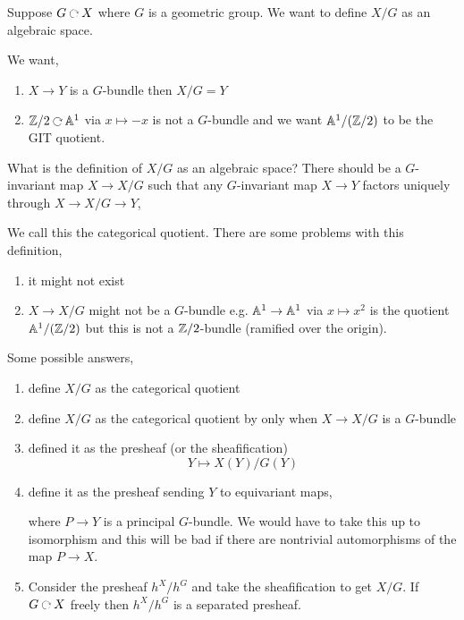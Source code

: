 \documentclass[12pt]{article}
\begin{document}
Suppose $G \acts X$ where $G$ is a geometric group. We want to define $X / G$ as an algebraic space. 

\begin{example}
We want,
\begin{enumerate}
\item $X \to Y$ is a $G$-bundle then $X/G = Y$
\item $\Z / 2 \acts \A^1$ via $x \mapsto -x$ is not a $G$-bundle and we want $\mathbb{A}^1 / (\mathbb{Z} / 2)$ to be the GIT quotient. 
\end{enumerate}
\end{example}
\noindent
What is the definition of $X/G$ as an algebraic space? There should be a $G$-invariant map $X \to X/G$ such that any $G$-invariant map $X \to Y$ factors uniquely through $X \to X / G \to Y$,
\begin{center}
\end{center} 
We call this the categorical quotient. There are some problems with this definition,
\begin{enumerate}
\item it might not exist
\item $X \to X / G$ might not be a $G$-bundle e.g. $\mathbb{A}^1 \to \mathbb{A}^1$ via $x \mapsto x^2$ is the quotient $\mathbb{A}^1 / (\mathbb{Z} / 2)$ but this is not a $\mathbb{Z}/2$-bundle (ramified over the origin). 
\end{enumerate}

Some possible answers,
\begin{enumerate}
\item define $X/G$ as the categorical quotient
\item define $X/G$ as the categorical quotient by only when $X \to X / G$ is a $G$-bundle
\item defined it as the presheaf (or the sheafification)
\[ Y \mapsto X(Y) / G(Y) \]
\item define it as the presheaf sending $Y$ to equivariant maps,
\begin{center}
\end{center}
where $P \to Y$ is a principal $G$-bundle. We would have to take this up to isomorphism and this will be bad if there are nontrivial automorphisms of the map $P \to X$.
\item Consider the presheaf $h^X / h^G$ and take the sheafification to get $X/G$. If $G \acts X$ freely then $h^X / h^G$ is a separated presheaf.
\end{enumerate}
\end{document}
